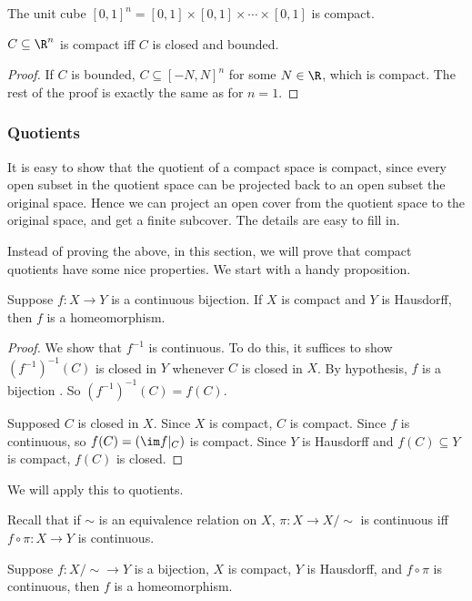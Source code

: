 \documentclass[a4paper]{article}
\begin{document}
\begin{eg}
  The unit cube $[0, 1]^n = [0, 1]\times [0, 1]\times \cdots \times [0, 1]$ is compact.
\end{eg}

\begin{cor}
  $C\subseteq \R^n$ is compact iff $C$ is closed and bounded.
\end{cor}

\begin{proof}
  If $C$ is bounded, $C\subseteq [-N, N]^n$ for some $N \in \R$, which is compact. The rest of the proof is exactly the same as for $n = 1$.
\end{proof}

\subsubsection{Quotients}
It is easy to show that the quotient of a compact space is compact, since every open subset in the quotient space can be projected back to an open subset the original space. Hence we can project an open cover from the quotient space to the original space, and get a finite subcover. The details are easy to fill in.

Instead of proving the above, in this section, we will prove that compact quotients have some nice properties. We start with a handy proposition.
\begin{prop}
  Suppose $f: X\to Y$ is a continuous bijection. If $X$ is compact and $Y$ is Hausdorff, then $f$ is a homeomorphism.
\end{prop}

\begin{proof}
  We show that $f^{-1}$ is continuous. To do this, it suffices to show $(f^{-1})^{-1}(C)$ is closed in $Y$ whenever $C$ is closed in $X$. By hypothesis, $f$ is a bijection . So $(f^{-1})^{-1}(C) = f(C)$.

  Supposed $C$ is closed in $X$. Since $X$ is compact, $C$ is compact. Since $f$ is continuous, so $f(C) = (\im f|_C)$ is compact. Since $Y$ is Hausdorff and $f(C) \subseteq Y$ is compact, $f(C)$ is closed.
\end{proof}

We will apply this to quotients.

Recall that if $\sim$ is an equivalence relation on $X$, $\pi: X\to X/{\sim}$ is continuous iff $f\circ \pi: X\to Y$ is continuous.

\begin{cor}
  Suppose $f: X/{\sim} \to Y$ is a bijection, $X$ is compact, $Y$ is Hausdorff, and $f\circ \pi$ is continuous, then $f$ is a homeomorphism.
\end{cor}
\end{document}
